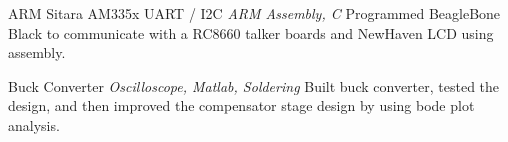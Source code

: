 \documentclass[letterpaper]{moderncv}        %
\begin{document}
\cventry
{}
{ARM Sitara AM335x UART / I2C}
{}
{\textit{ARM Assembly, C}}
{}
{Programmed BeagleBone Black to communicate with a RC8660 talker boards and NewHaven LCD using assembly.\\}
\vspace{-1mm}			

\cventry
{}
{Buck Converter}
{}
{\textit{Oscilloscope, Matlab, Soldering}}
{}
{Built buck converter, tested the design, and then improved the compensator stage design by using bode plot analysis.\\}
\vspace{-1mm}	


				
\end{document}
